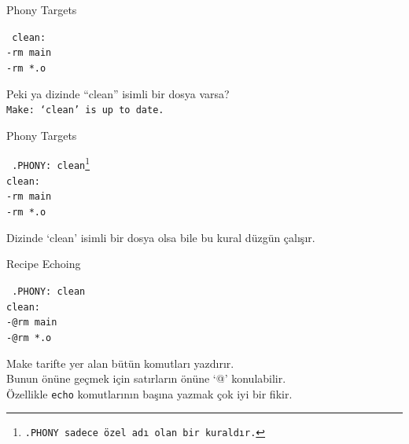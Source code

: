 \documentclass{beamer}
\begin{document}
\begin{frame}
    {Phony Targets}

\texttt{%
        clean:\\
        \hspace{10mm}   -rm main\\
        \hspace{10mm}   -rm *.o\\}

        \vspace{5mm}

        Peki ya dizinde ``clean'' isimli bir dosya varsa?\\
        \vspace{3mm}
        \texttt{Make: `clean' is up to date.}

\end{frame}

\begin{frame}
    {Phony Targets}

\texttt{%
    .PHONY: clean\footnote{.PHONY sadece özel adı olan bir kuraldır.}\\
        clean:\\
        \hspace{10mm}   -rm main\\
        \hspace{10mm}   -rm *.o\\}

        \vspace{5mm}
        Dizinde `clean' isimli bir dosya olsa bile bu kural düzgün çalışır.

        \vspace{3mm}

\end{frame}

\begin{frame}
    {Recipe Echoing}

\texttt{%
        .PHONY: clean\\
        clean:\\
        \hspace{10mm}   -@rm main\\
        \hspace{10mm}   -@rm *.o\\}

        \vspace{5mm}
Make tarifte yer alan bütün komutları yazdırır.\\
    Bunun önüne geçmek için satırların önüne `@' konulabilir.\\         \vspace{3mm}
    Özellikle \texttt{echo} komutlarının başına yazmak çok iyi bir fikir.

\end{frame}
\end{document}
